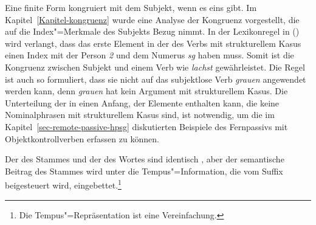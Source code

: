 Eine finite Form kongruiert mit dem Subjekt, wenn es eins gibt. Im Kapitel~\ref{Kapitel-kongruenz}
wurde eine Analyse der Kongruenz vorgestellt, die auf die Index"=Merkmale des Subjekts Bezug nimmt.
In der Lexikonregel in () wird verlangt, dass das erste Element in der \compsl des Verbs mit
strukturellem Kasus einen Index mit der Person \emph{2} und dem Numerus \emph{sg} haben muss.
Somit ist die Kongruenz zwischen Subjekt und einem Verb wie \emph{lachst} gewährleistet. Die Regel
ist auch so formuliert, dass sie nicht auf das subjektlose Verb \emph{grauen} angewendet werden kann,
denn \emph{grauen} hat kein Argument mit strukturellem Kasus. Die Unterteilung der \compsl in einen
Anfang, der Elemente enthalten kann, die keine Nominalphrasen mit strukturellem Kasus sind, ist
notwendig, um die im Kapitel~\ref{sec-remote-passive-hpsg} diskutierten Beispiele des Fernpassivs mit
Objektkontrollverben erfassen zu können.%

Der \catw des Stammes und der \catw des Wortes sind identisch , aber der semantische
Beitrag des Stammes wird unter die Tempus"=Information, die vom Suffix beigesteuert wird,
eingebettet.\footnote{ 
  Die Tempus"=Repräsentation ist eine Vereinfachung.%
}

